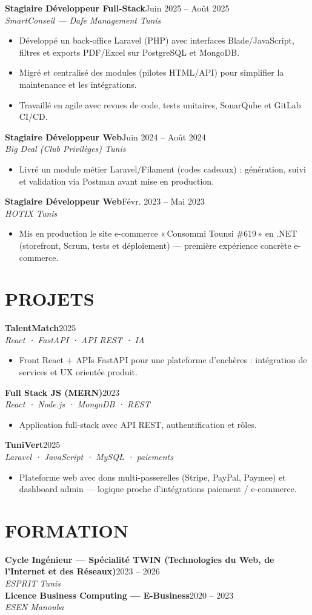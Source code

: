 \documentclass[10pt,a4paper]{article}
\newcommand{\job}[3]{%
  \textbf{\color{primary}#1}\hfill{\color{muted}\small #2}\\[-1pt]
  {\color{accent}\textit{#3}}\\[2pt]
  \begin{itemize}[leftmargin=0.85em, itemsep=1pt, topsep=0pt, parsep=0pt, partopsep=0pt]
}
\newcommand{\proj}[3]{%
  \textbf{\color{primary}#1}\hfill{\color{muted}\small #2}\\[-1pt]
  {\color{accent}\textit{#3}}\\[1pt]
  \begin{itemize}[leftmargin=0.85em, itemsep=1pt, topsep=0pt, parsep=0pt, partopsep=0pt]
}
\newcommand{\edu}[3]{%
  \textbf{\color{primary}#1}\hfill{\color{muted}\small #2}\\[-1pt]
  {\color{accent}\textit{#3}}\\[3pt]
}
\begin{document}
\job{Stagiaire Développeur Full-Stack}{Juin 2025 -- Août 2025}{SmartConseil — Dafe Management \textbar{} Tunis}
  \item Développé un back-office Laravel (PHP) avec interfaces Blade/JavaScript, filtres et exports PDF/Excel sur PostgreSQL et MongoDB.
  \item Migré et centralisé des modules (pilotes HTML/API) pour simplifier la maintenance et les intégrations.
  \item Travaillé en agile avec revues de code, tests unitaires, SonarQube et GitLab CI/CD.
\end{itemize}

\job{Stagiaire Développeur Web}{Juin 2024 -- Août 2024}{Big Deal (Club Privilèges) \textbar{} Tunis}
  \item Livré un module métier Laravel/Filament (codes cadeaux) : génération, suivi et validation via Postman avant mise en production.
\end{itemize}

\job{Stagiaire Développeur Web}{Févr. 2023 -- Mai 2023}{HOTIX \textbar{} Tunis}
  \item Mis en production le site e-commerce «\,Consommi Tounsi \#619\,» en .NET (storefront, Scrum, tests et déploiement) --- première expérience concrète e-commerce.
\end{itemize}

\section{PROJETS}
{\footnotesize
\setlength{\parskip}{1pt}
\proj{TalentMatch}{2025}{React · FastAPI · API REST · IA}
  \item Front React + APIs FastAPI pour une plateforme d'enchères : intégration de services et UX orientée produit.
\end{itemize}
\proj{Full Stack JS (MERN)}{2023}{React · Node.js · MongoDB · REST}
  \item Application full-stack avec API REST, authentification et rôles.
\end{itemize}
\proj{TuniVert}{2025}{Laravel · JavaScript · MySQL · paiements}
  \item Plateforme web avec dons multi-passerelles (Stripe, PayPal, Paymee) et dashboard admin --- logique proche d'intégrations paiement / e-commerce.
\end{itemize}
}

\section{FORMATION}
\edu{Cycle Ingénieur — Spécialité TWIN (Technologies du Web, de l'Internet et des Réseaux)}{2023 -- 2026}{ESPRIT \textbar{} Tunis}
\edu{Licence Business Computing — E-Business}{2020 -- 2023}{ESEN \textbar{} Manouba}
\end{document}
